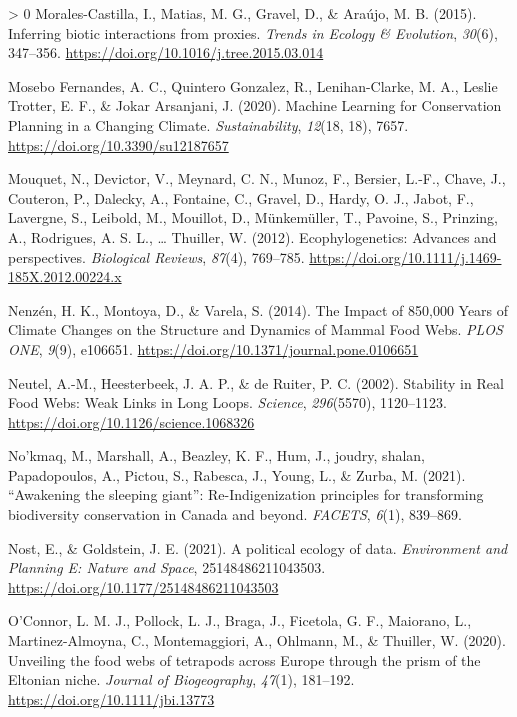\documentclass[10pt,oneside]{article}
\newlength{\cslhangindent}
\newenvironment{CSLReferences}[3] %
 {%
  \setlength{\parindent}{0pt}
  \ifodd #1 \everypar{\setlength{\hangindent}{\cslhangindent}}\ignorespaces\fi
  \ifnum #2 > 0
  \setlength{\parskip}{#2\baselineskip}
  \fi
 }%
 {}
\begin{document}
\begin{CSLReferences}{1}{0}
\leavevmode\hypertarget{ref-Morales-Castilla2015InfBio}{}%
Morales-Castilla, I., Matias, M. G., Gravel, D., \& Araújo, M. B.
(2015). Inferring biotic interactions from proxies. \emph{Trends in
Ecology \& Evolution}, \emph{30}(6), 347--356.
\url{https://doi.org/10.1016/j.tree.2015.03.014}

\leavevmode\hypertarget{ref-MoseboFernandes2020MacLea}{}%
Mosebo Fernandes, A. C., Quintero Gonzalez, R., Lenihan-Clarke, M. A.,
Leslie Trotter, E. F., \& Jokar Arsanjani, J. (2020). Machine Learning
for Conservation Planning in a Changing Climate. \emph{Sustainability},
\emph{12}(18, 18), 7657. \url{https://doi.org/10.3390/su12187657}

\leavevmode\hypertarget{ref-Mouquet2012EcoAdv}{}%
Mouquet, N., Devictor, V., Meynard, C. N., Munoz, F., Bersier, L.-F.,
Chave, J., Couteron, P., Dalecky, A., Fontaine, C., Gravel, D., Hardy,
O. J., Jabot, F., Lavergne, S., Leibold, M., Mouillot, D., Münkemüller,
T., Pavoine, S., Prinzing, A., Rodrigues, A. S. L., \ldots{} Thuiller,
W. (2012). Ecophylogenetics: Advances and perspectives. \emph{Biological
Reviews}, \emph{87}(4), 769--785.
\url{https://doi.org/10.1111/j.1469-185X.2012.00224.x}

\leavevmode\hypertarget{ref-Nenzen2014Imp850}{}%
Nenzén, H. K., Montoya, D., \& Varela, S. (2014). The Impact of 850,000
Years of Climate Changes on the Structure and Dynamics of Mammal Food
Webs. \emph{PLOS ONE}, \emph{9}(9), e106651.
\url{https://doi.org/10.1371/journal.pone.0106651}

\leavevmode\hypertarget{ref-Neutel2002StaRea}{}%
Neutel, A.-M., Heesterbeek, J. A. P., \& de Ruiter, P. C. (2002).
Stability in Real Food Webs: Weak Links in Long Loops. \emph{Science},
\emph{296}(5570), 1120--1123.
\url{https://doi.org/10.1126/science.1068326}

\leavevmode\hypertarget{ref-Nokmaq2021AwaSle}{}%
No'kmaq, M., Marshall, A., Beazley, K. F., Hum, J., joudry, shalan,
Papadopoulos, A., Pictou, S., Rabesca, J., Young, L., \& Zurba, M.
(2021). {``Awakening the sleeping giant''}: Re-Indigenization principles
for transforming biodiversity conservation in Canada and beyond.
\emph{FACETS}, \emph{6}(1), 839--869.

\leavevmode\hypertarget{ref-Nost2021PolEco}{}%
Nost, E., \& Goldstein, J. E. (2021). A political ecology of data.
\emph{Environment and Planning E: Nature and Space}, 25148486211043503.
\url{https://doi.org/10.1177/25148486211043503}

\leavevmode\hypertarget{ref-OConnor2020UnvFoo}{}%
O'Connor, L. M. J., Pollock, L. J., Braga, J., Ficetola, G. F.,
Maiorano, L., Martinez-Almoyna, C., Montemaggiori, A., Ohlmann, M., \&
Thuiller, W. (2020). Unveiling the food webs of tetrapods across Europe
through the prism of the Eltonian niche. \emph{Journal of Biogeography},
\emph{47}(1), 181--192. \url{https://doi.org/10.1111/jbi.13773}


\end{CSLReferences}
\end{document}
